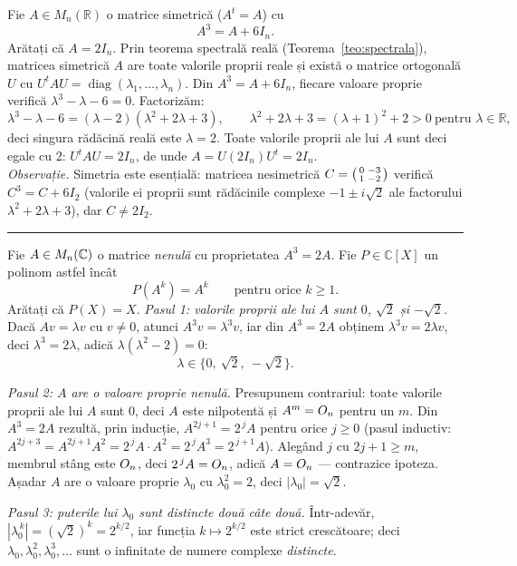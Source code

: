 Fie $A\in M_n(\mathbb{R})$ o matrice simetrică ($A^t=A$) cu
\[ A^3=A+6I_n. \]
Arătați că $A=2I_n$.
\sol Prin teorema spectrală reală (Teorema~\ref{teo:spectrala}), matricea simetrică $A$ are toate valorile proprii reale și există o matrice ortogonală $U$ cu $U^tAU=\operatorname{diag}(\lambda_1,\dots,\lambda_n)$. Din $A^3=A+6I_n$, fiecare valoare proprie verifică $\lambda^3-\lambda-6=0$. Factorizăm:
\[ \lambda^3-\lambda-6=(\lambda-2)(\lambda^2+2\lambda+3),\qquad \lambda^2+2\lambda+3=(\lambda+1)^2+2>0\ \text{pentru }\lambda\in\mathbb{R}, \]
deci singura rădăcină reală este $\lambda=2$. Toate valorile proprii ale lui $A$ sunt deci egale cu $2$: $U^tAU=2I_n$, de unde $A=U(2I_n)U^t=2I_n$.\\[2pt]
\emph{Observație.} Simetria este esențială: matricea nesimetrică $C=\begin{psmallmatrix}0&-3\\1&-2\end{psmallmatrix}$ verifică $C^3=C+6I_2$ (valorile ei proprii sunt rădăcinile complexe $-1\pm i\sqrt2$ ale factorului $\lambda^2+2\lambda+3$), dar $C\neq2I_2$.
\vspace{1mm}\hrule

Fie $A\in M_n(\mathbb{C})$ o matrice \emph{nenulă} cu proprietatea $A^3=2A$. Fie $P\in\mathbb{C}[X]$ un polinom astfel încât
\[ P(A^k)=A^k\qquad\text{pentru orice }k\ge1 . \]
Arătați că $P(X)=X$.
\sol \emph{Pasul 1: valorile proprii ale lui $A$ sunt $0$, $\sqrt2$ și $-\sqrt2$.} Dacă $Av=\lambda v$ cu $v\neq0$, atunci $A^3v=\lambda^3v$, iar din $A^3=2A$ obținem $\lambda^3v=2\lambda v$, deci $\lambda^3=2\lambda$, adică $\lambda(\lambda^2-2)=0$:
\[ \lambda\in\{0,\ \sqrt2,\ -\sqrt2\}. \]

\emph{Pasul 2: $A$ are o valoare proprie nenulă.} Presupunem contrariul: toate valorile proprii ale lui $A$ sunt $0$, deci $A$ este nilpotentă și $A^m=O_n$ pentru un $m$. Din $A^3=2A$ rezultă, prin inducție, $A^{2j+1}=2^{\,j}A$ pentru orice $j\ge0$ (pasul inductiv: $A^{2j+3}=A^{2j+1}A^2=2^{\,j}A\cdot A^2=2^{\,j}A^3=2^{\,j+1}A$). Alegând $j$ cu $2j+1\ge m$, membrul stâng este $O_n$, deci $2^{\,j}A=O_n$, adică $A=O_n$ --- contrazice ipoteza. Așadar $A$ are o valoare proprie $\lambda_0$ cu $\lambda_0^2=2$, deci $|\lambda_0|=\sqrt2$.

\emph{Pasul 3: puterile lui $\lambda_0$ sunt distincte două câte două.} Într-adevăr, $|\lambda_0^{\,k}|=(\sqrt2)^k=2^{k/2}$, iar funcția $k\mapsto2^{k/2}$ este strict crescătoare; deci $\lambda_0,\lambda_0^2,\lambda_0^3,\dots$ sunt o infinitate de numere complexe \emph{distincte}.


